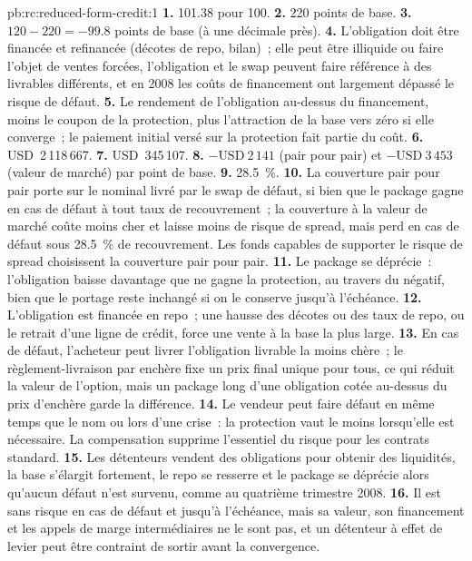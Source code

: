 \begin{solution}{pb:rc:reduced-form-credit:1}
\textbf{1.} 101.38 pour 100.
\textbf{2.} 220 points de base.
\textbf{3.} $120-220 = -99.8$ points de base (à une décimale près).
\textbf{4.} L'obligation doit être financée et refinancée (décotes de repo, bilan)~; elle peut être
illiquide ou faire l'objet de ventes forcées, l'obligation et le swap peuvent faire référence à des
livrables différents, et en 2008 les coûts de financement ont largement dépassé le risque de défaut.
\textbf{5.} Le rendement de l'obligation au-dessus du financement, moins le coupon de la protection,
plus l'attraction de la base vers zéro si elle converge~; le paiement initial versé sur la protection fait partie du coût.
\textbf{6.} USD~2\,118\,667.
\textbf{7.} USD~345\,107.
\textbf{8.} $-\text{USD}~2\,141$ (pair pour pair) et $-\text{USD}~3\,453$ (valeur de marché) par point de
base.
\textbf{9.} 28.5~\%.
\textbf{10.} La couverture pair pour pair porte sur le nominal livré par le swap de défaut, si bien que le package
gagne en cas de défaut à tout taux de recouvrement~; la couverture à la valeur de marché coûte moins cher
et laisse moins de risque de spread, mais perd en cas de défaut sous 28.5~\% de recouvrement. Les fonds
capables de supporter le risque de spread choisissent la couverture pair pour pair.
\textbf{11.} Le package se déprécie~: l'obligation baisse davantage que ne gagne la protection, au
travers du  négatif, bien que le portage reste inchangé si on le conserve jusqu'à l'échéance.
\textbf{12.} L'obligation est financée en repo~; une hausse des décotes ou des taux de repo, ou le
retrait d'une ligne de crédit, force une vente à la base la plus large.
\textbf{13.} En cas de défaut, l'acheteur peut livrer l'obligation livrable la moins chère~; le
règlement-livraison par enchère fixe un prix final unique pour tous, ce qui réduit la valeur de
l'option, mais un package long d'une obligation cotée au-dessus du prix d'enchère garde la différence.
\textbf{14.} Le vendeur peut faire défaut en même temps que le nom ou lors d'une crise~: la protection
vaut le moins lorsqu'elle est nécessaire. La compensation supprime l'essentiel du risque pour les contrats standard.
\textbf{15.} Les détenteurs vendent des obligations pour obtenir des liquidités, la base s'élargit
fortement, le repo se resserre et le package se déprécie alors qu'aucun défaut n'est survenu, comme au quatrième trimestre 2008.
\textbf{16.} Il est sans risque en cas de défaut et jusqu'à l'échéance, mais sa valeur, son
financement et les appels de marge intermédiaires ne le sont pas, et un détenteur à effet de levier peut être contraint de sortir avant la convergence.

\end{solution}
